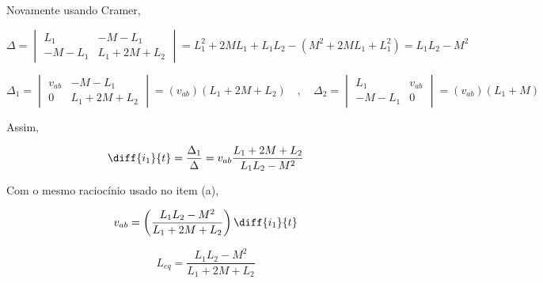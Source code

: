 \endgroup

Novamente usando Cramer,

\begingroup
\renewcommand*{\arraystretch}{1.5}

\[ 
    \Delta
    =
    \begin{vmatrix}
        L_1 & - M - L_1    \\
        - M - L_1    & L_1 + 2M + L_2
    \end{vmatrix}
    =
    L_1^2 + 2ML_1 + L_1L_2 - (M^2 + 2ML_1 + L_1^2)
    =
    L_1L_2 - M^2
\]

\[ 
    \Delta_1
    =
    \begin{vmatrix}
        v_{ab} & - M - L_1    \\
        0    & L_1 + 2M + L_2
    \end{vmatrix}
    =
    (v_{ab})(L_1 + 2M + L_2) \quad , \quad
    \Delta_2
    =
    \begin{vmatrix}
        L_1 & v_{ab}   \\
        - M - L_1    & 0
    \end{vmatrix}
    =
    (v_{ab})(L_1 + M)
\]

\endgroup

Assim, 

\[ \diff{i_1}{t} = \frac{\Delta_1}{\Delta} = v_{ab}\frac{L_1 + 2M + L_2}{L_1L_2 - M^2} \]

Com o mesmo raciocínio usado no item (a),

\[ v_{ab} =  \left(\frac{L_1L_2 - M^2}{L_1 + 2M + L_2}\right)\diff{i_1}{t} \]

\[ \boxed{L_{eq} = \frac{L_1L_2 - M^2}{L_1 + 2M + L_2}}  \]



